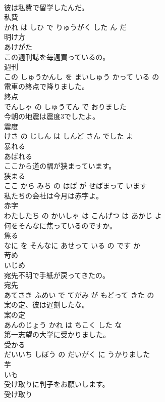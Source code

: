 \documentclass[8pt]{extreport}
\begin{document}
\begin{CJK}{UTF8}{min}
\\	彼は私費で留学したんだ。	
\\	私費 
\\	かれ は しひ で りゅうがく した ん だ			
\\	明け方	
\\	あけがた		
\\	この週刊誌を毎週買っているの。	
\\	週刊 
\\	この しゅうかんし を まいしゅう かって いる の			
\\	電車の終点で降りました。	
\\	終点 
\\	でんしゃ の しゅうてん で おりました			
\\	今朝の地震は震度3でしたよ。	
\\	震度 
\\	けさ の じしん は しんど さん でした よ			
\\	暴れる	
\\	あばれる		
\\	ここから道の幅が狭まっています。	
\\	狭まる 
\\	ここ から みち の はば が せばまって います			
\\	私たちの会社は今月は赤字よ。	
\\	赤字 
\\	わたしたち の かいしゃ は こんげつ は あかじ よ			
\\	何をそんなに焦っているのですか。	
\\	焦る 
\\	なに を そんなに あせって いる の です か			
\\	苛め	
\\	いじめ		
\\	宛先不明で手紙が戻ってきたの。	
\\	宛先 
\\	あてさき ふめい で てがみ が もどって きた の			
\\	案の定、彼は遅刻したな。	
\\	案の定 
\\	あんのじょう かれ は ちこく した な			
\\	第一志望の大学に受かりました。	
\\	受かる 
\\	だいいち しぼう の だいがく に うかりました			
\\	芋	
\\	いも		
\\	受け取りに判子をお願いします。	
\\	受け取り 

\end{CJK}
\end{document}
